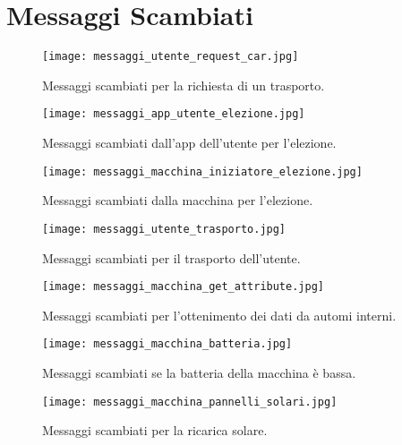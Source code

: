\chapter{Messaggi Scambiati}\label{messaggi_scambiati_appendix}

\begin{figure}[htbp]
	\centering
	\texttt{[image: messaggi\_utente\_request\_car.jpg]}
	\caption{Messaggi scambiati per la richiesta di un trasporto.}
	\label{fig:messaggi_utente_request_car}
\end{figure}

\begin{figure}[htbp]
	\centering
	\texttt{[image: messaggi\_app\_utente\_elezione.jpg]}
	\caption{Messaggi scambiati dall'app dell'utente per l'elezione.}
	\label{fig:messaggi_app_utente_elezione}
\end{figure}

\begin{figure}[htbp]
	\centering
	\texttt{[image: messaggi\_macchina\_iniziatore\_elezione.jpg]}
	\caption{Messaggi scambiati dalla macchina per l'elezione.}
	\label{fig:messaggi_macchina_iniziatore_elezione}
\end{figure}

\begin{figure}[htbp]
	\centering
	\texttt{[image: messaggi\_utente\_trasporto.jpg]}
	\caption{Messaggi scambiati per il trasporto dell'utente.}
	\label{fig:messaggi_utente_trasporto}
\end{figure}

\begin{figure}[htbp]
	\centering
	\texttt{[image: messaggi\_macchina\_get\_attribute.jpg]}
	\caption{Messaggi scambiati per l'ottenimento dei dati da automi interni.}
	\label{fig:messaggi_macchina_get_attribute}
\end{figure}

\begin{figure}[htbp]
	\centering
	\texttt{[image: messaggi\_macchina\_batteria.jpg]}
	\caption{Messaggi scambiati se la batteria della macchina è bassa.}
	\label{fig:messaggi_macchina_batteria}
\end{figure}

\begin{figure}[htbp]
	\centering
	\texttt{[image: messaggi\_macchina\_pannelli\_solari.jpg]}
	\caption{Messaggi scambiati per la ricarica solare.}
	\label{fig:messaggi_macchina_pannelli_solari}
\end{figure}

